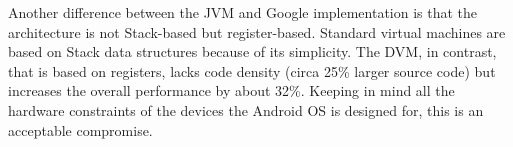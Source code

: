 Another difference between the JVM and Google implementation is that
the architecture is not Stack-based but register-based. Standard
virtual machines are based on Stack data structures because of its
simplicity. The DVM, in contrast, that is based on registers, lacks
code density (circa 25\% larger source code) but increases the overall
performance by about 32\%. Keeping in mind all the hardware constraints
of the devices the Android OS is designed for, this is an acceptable
compromise.
